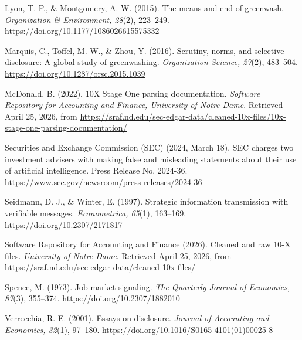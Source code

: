 Lyon, T. P., \& Montgomery, A. W. (2015). The means and end of greenwash. \textit{Organization \& Environment, 28}(2), 223--249. \url{https://doi.org/10.1177/1086026615575332}

Marquis, C., Toffel, M. W., \& Zhou, Y. (2016). Scrutiny, norms, and selective disclosure: A global study of greenwashing. \textit{Organization Science, 27}(2), 483--504. \url{https://doi.org/10.1287/orsc.2015.1039}

McDonald, B. (2022). 10X Stage One parsing documentation. \textit{Software Repository for Accounting and Finance, University of Notre Dame}. Retrieved April 25, 2026, from \url{https://sraf.nd.edu/sec-edgar-data/cleaned-10x-files/10x-stage-one-parsing-documentation/}

Securities and Exchange Commission (SEC) (2024, March 18). SEC charges two investment advisers with making false and misleading statements about their use of artificial intelligence. Press Release No. 2024-36. \url{https://www.sec.gov/newsroom/press-releases/2024-36}

Seidmann, D. J., \& Winter, E. (1997). Strategic information transmission with verifiable messages. \textit{Econometrica, 65}(1), 163--169. \url{https://doi.org/10.2307/2171817}

Software Repository for Accounting and Finance (2026). Cleaned and raw 10-X files. \textit{University of Notre Dame}. Retrieved April 25, 2026, from \url{https://sraf.nd.edu/sec-edgar-data/cleaned-10x-files/}

Spence, M. (1973). Job market signaling. \textit{The Quarterly Journal of Economics, 87}(3), 355--374. \url{https://doi.org/10.2307/1882010}

Verrecchia, R. E. (2001). Essays on disclosure. \textit{Journal of Accounting and Economics, 32}(1), 97--180. \url{https://doi.org/10.1016/S0165-4101(01)00025-8}

\endgroup
